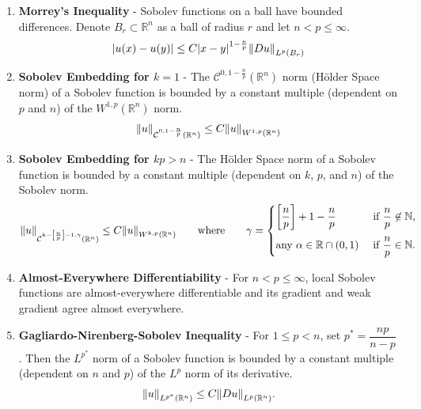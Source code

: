 \documentclass{article}
\newcommand{\Rl}{\mathbb{R}}
\begin{document}
\begin{enumerate}
        \item
            \textbf{Morrey's Inequality} - Sobolev functions on a ball have bounded differences.  Denote $B_r \subset \Rl^n$ as a ball of radius $r$ and let $n < p \leq \infty$.
            \begin{align*}
                \abs{u(x) - u(y)} \leq C \abs{x - y}^{1 - \frac{n}{p}}\norm{D u}_{L^p(B_r)}
            \end{align*}
        \item
            \textbf{Sobolev Embedding for $k = 1$} - The $\mathcal{C}^{0,1 - \frac{n}{p}}(\Rl^n)$ norm (H\"{o}lder Space norm) of a Sobolev function is bounded by a constant multiple (dependent on $p$ and $n$) of the $W^{1,p}(\Rl^n)$ norm.
            \begin{align*}
                \norm{u}_{\mathcal{C}^{0, 1 - \frac{n}{p}}(\Rl^n)} \leq C\norm{u}_{W^{1,p}(\Rl^n)}
            \end{align*}
        \item
            \textbf{Sobolev Embedding for $kp > n$} - The H\"{o}lder Space norm of a Sobolev function is bounded by a constant multiple (dependent on $k$, $p$, and $n$) of the Sobolev norm.
            \begin{align*}
                \norm{u}_{\mathcal{C}^{k - \qty[\frac{n}{p}] - 1, \gamma}(\Rl^n)} \leq C \norm{u}_{W^{k,p}(\Rl^n)} \qquad \text{where} \qquad \gamma = \begin{cases}
                    \qty[\dfrac{n}{p}] + 1 - \dfrac{n}{p} & \text{ if } \dfrac{n}{p} \not\in \mathbb{N},\\[0.4cm]
                    \text{any } \alpha \in \Rl \cap (0,1) & \text{ if } \dfrac{n}{p} \in \mathbb{N}.
                \end{cases}
            \end{align*}
        \item 
            \textbf{Almost-Everywhere Differentiability} - For $n < p \leq \infty$, local Sobolev functions are almost-everywhere differentiable and its gradient and weak gradient agree almost everywhere.
        \item
            \textbf{Gagliardo-Nirenberg-Sobolev Inequality} - For $1 \leq p < n$, set $p^* = \dfrac{np}{n - p}$.  Then the $L^{p^*}$ norm of a Sobolev function is bounded by a constant multiple (dependent on $n$ and $p$) of the $L^p$ norm of its derivative.
            \begin{align*}
                \norm{u}_{L^{p^*}(\Rl^n)} \leq C\norm{Du}_{L^p(\Rl^n)}.
            \end{align*}
    \end{enumerate}
\end{document}
